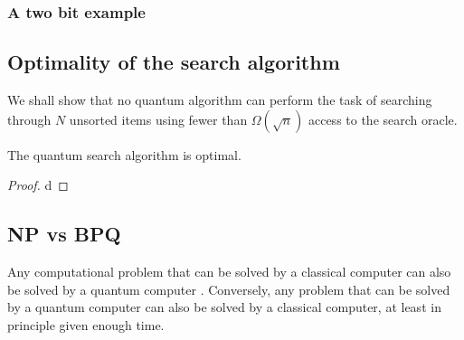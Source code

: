 \subsubsection{A two bit example}

\subsection{Optimality of the search algorithm}
We shall show that no quantum algorithm can perform the task of searching through $N$ unsorted items using fewer than $\Omega(\sqrt{n})$ access to the search oracle.
\begin{theorem}
The quantum search algorithm is optimal. 
\end{theorem}
\begin{proof}
d
\end{proof}
\subsection{NP vs BPQ}

Any computational problem that can be solved by a classical computer can also be solved by a quantum computer \cite[29]{NielsenChuang}. Conversely, any problem that can be solved by a quantum computer can also be solved by a classical computer, at least in principle given enough time.